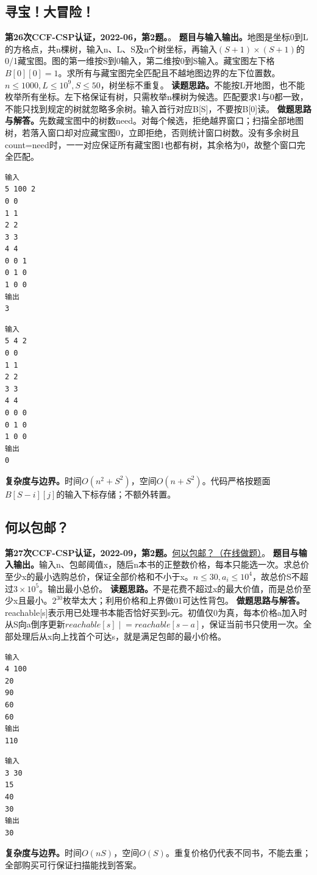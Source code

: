 \subsection{寻宝！大冒险！}
\textbf{第26次CCF-CSP认证，2022-06，第2题。}。
\textbf{题目与输入输出。}地图是坐标0到L的方格点，共n棵树，输入n、L、S及n个树坐标，再输入$(S+1)\times(S+1)$的0/1藏宝图。图的第一维按S到0输入，第二维按0到S输入。藏宝图左下格$B[0][0]=1$。求所有与藏宝图完全匹配且不越地图边界的左下位置数。$n\le1000,L\le10^9,S\le50$，树坐标不重复。
\textbf{读题思路。}不能按L开地图，也不能枚举所有坐标。左下格保证有树，只需枚举n棵树为候选。匹配要求1与0都一致，不能只找到规定的树就忽略多余树。输入首行对应B[S]，不要按B[0]读。
\textbf{做题思路与解答。}先数藏宝图中的树数need。对每个候选，拒绝越界窗口；扫描全部地图树，若落入窗口却对应藏宝图0，立即拒绝，否则统计窗口树数。没有多余树且count=need时，一一对应保证所有藏宝图1也都有树，其余格为0，故整个窗口完全匹配。
\begin{verbatim}
输入
5 100 2
0 0
1 1
2 2
3 3
4 4
0 0 1
0 1 0
1 0 0
输出
3
\end{verbatim}
\begin{verbatim}
输入
5 4 2
0 0
1 1
2 2
3 3
4 4
0 0 0
0 1 0
1 0 0
输出
0
\end{verbatim}
\textbf{复杂度与边界。}时间$O(n^2+S^2)$，空间$O(n+S^2)$。代码严格按题面$B[S-i][j]$的输入下标存储；不额外转置。
\subsection{何以包邮？}
\textbf{第27次CCF-CSP认证，2022-09，第2题。}\href{https://www.acwing.com/problem/content/4703/}{何以包邮？（在线做题）}。
\textbf{题目与输入输出。}输入n、包邮阈值x，随后n本书的正整数价格，每本只能选一次。求总价至少x的最小选购总价，保证全部价格和不小于x。$n\le30,a_i\le10^4$，故总价S不超过$3\times10^5$。输出最小总价。
\textbf{读题思路。}不是花费不超过x的最大价值，而是总价至少x且最小。$2^{30}$枚举太大；利用价格和上界做01可达性背包。
\textbf{做题思路与解答。}reachable[s]表示用已处理书本能否恰好买到s元。初值仅0为真，每本价格a加入时从S向a倒序更新$reachable[s]\mathrel{|}=reachable[s-a]$，保证当前书只使用一次。全部处理后从x向上找首个可达s，就是满足包邮的最小价格。
\begin{verbatim}
输入
4 100
20
90
60
60
输出
110
\end{verbatim}
\begin{verbatim}
输入
3 30
15
40
30
输出
30
\end{verbatim}
\textbf{复杂度与边界。}时间$O(nS)$，空间$O(S)$。重复价格仍代表不同书，不能去重；全部购买可行保证扫描能找到答案。

